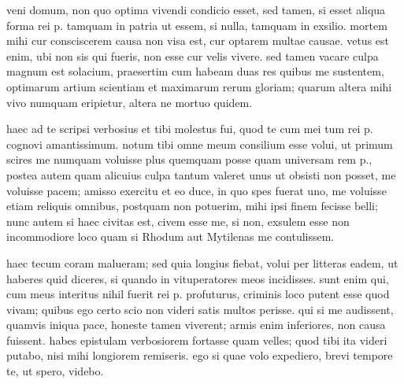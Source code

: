  veni domum, non quo optima vivendi condicio esset, sed tamen, si esset aliqua forma rei p. tamquam in patria ut essem, si nulla, tamquam in exsilio. mortem mihi cur consciscerem causa non visa est, cur optarem multae causae. vetus est enim, ubi non sis qui fueris, non esse cur velis vivere. sed tamen vacare culpa magnum est solacium, praesertim cum habeam duas res quibus me sustentem, optimarum artium scientiam et maximarum rerum gloriam; quarum altera mihi vivo numquam eripietur, altera ne mortuo quidem.

 haec ad te scripsi verbosius et tibi molestus fui, quod te cum mei tum rei p. cognovi amantissimum. notum tibi omne meum consilium esse volui, ut primum scires me numquam voluisse plus quemquam posse quam universam rem p., postea autem quam alicuius culpa tantum valeret unus ut obsisti non posset, me voluisse pacem; amisso exercitu et eo duce, in quo spes fuerat uno, me voluisse etiam reliquis omnibus, postquam non potuerim, mihi ipsi finem fecisse belli; nunc autem si haec civitas est, civem esse me, si non, exsulem esse non incommodiore loco quam si Rhodum aut Mytilenas me contulissem.

 haec tecum coram malueram; sed quia longius fiebat, volui per litteras eadem, ut haberes quid diceres, si quando in vituperatores meos incidisses. sunt enim qui, cum meus interitus nihil fuerit rei p. profuturus, criminis loco putent esse quod vivam; quibus ego certo scio non videri satis multos perisse. qui si me audissent, quamvis iniqua pace, honeste tamen viverent; armis enim inferiores, non causa fuissent. habes epistulam verbosiorem fortasse quam velles; quod tibi ita videri putabo, nisi mihi longiorem remiseris. ego si quae volo expediero, brevi tempore te, ut spero, videbo.

